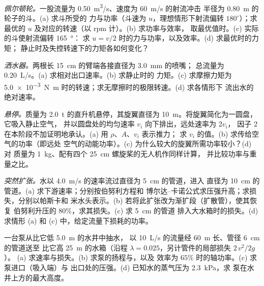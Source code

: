 \begin{exercise}[$\star\star$]\label{exo:b2:flow-balances:5}
\emph{佩尔顿轮。}一股流量为 \qty{0.50}{m^3/s}、速度为 \qty{60}{m/s} 的射流冲击
半径为 \qty{0.80}{m} 的轮子的斗。(a) 求斗所受的
力与功率（斗速为 $u$，理想情形下射流偏转 $180^\circ$）；求最优的 $u$
及对应的转速（以 rpm 计）。(b) 求功率与效率，
取最优值时。(c) 实际的斗使射流偏转 \qty{165}{\degree}：
求 $u = v/2$ 时的力与功率，以及效率。(d) 求最优时的力矩；
静止时及失控转速下的力矩各如何变化？
\end{exercise}

\begin{exercise}[$\star\star$]\label{exo:b2:flow-balances:6}
\emph{洒水器。}两根长 \qty{15}{cm} 的臂端各接直径为 \qty{3.0}{mm} 的喷嘴；
总流量为 \qty{0.20}{L/s}。(a) 求相对出口速率。(b) 求静止时的
力矩。(c) 求摩擦力矩为
\qty{5.0e-3}{N.m} 时的转速；求无摩擦时的极限转速。(d) 求各情形下
流出水的绝对速率。
\end{exercise}

\begin{exercise}[$\star\star$]\label{exo:b2:flow-balances:7}
\emph{悬停。}质量为 \qty{2.0}{t} 的直升机悬停，其旋翼直径为
\qty{10}{m}。将旋翼简化为一圆盘，它吸入静止空气，
并以圆盘处的均匀速率 $v_i$ 向下排出，远处速率为 $2v_i$，
因子 2 在本阶段不加证明地承认。(a) 用 $\rho$、$A$、$v_i$ 表示推力；
求 $v_i$ 的值。(b) 求传给空气的功率（即远处
空气的动能功率）。(c) 为什么较大的旋翼所需功率较小？(d) 对
质量为 \qty{1}{kg}、配有四个 \qty{25}{cm} 螺旋桨的无人机作同样计算，
并比较功率与重量之比。
\end{exercise}

\begin{exercise}[$\star\star$]\label{exo:b2:flow-balances:8}
\emph{突然扩张。}水以 \qty{4.0}{m/s} 的速率流过直径为 \qty{5}{cm} 的管道，进入
直径为 \qty{10}{cm} 的管道。(a) 求下游速率；分别按伯努利方程和
博尔达–卡诺公式求压强升高；求损失，分别以帕斯卡和
米水头表示。(b) 若将此扩张改为渐扩段（扩散管），使其恢复
伯努利升压的 $80\%$，求其损失。(c) 求 \qty{5}{cm} 的管道
排入大水箱时的损失。(d) 求情形 (a) 和 (c) 中，给定流量下损耗的功率。
\end{exercise}

\begin{exercise}[$\star\star$]\label{exo:b2:flow-balances:9}
一台泵从比它低 \qty{5.0}{m} 的水井中抽水，
以 \qty{10}{L/s} 的流量经 \qty{60}{m} 长、管径 \qty{6}{cm} 的管道送至
比它高 \qty{25}{m} 的水箱（沿程 $\lambda = 0.025$，另计管件的局部损失 $2\,v^2/2g$）。
(a) 求速率与损失。(b) 求泵的扬程与，以及
效率为 $65\%$ 时的轴功率。(c) 求泵进口（吸入端）与
出口处的压强。(d) 已知水的蒸气压为 \qty{2.3}{kPa}，求
泵在水井上方的最大高度。
\end{exercise}

